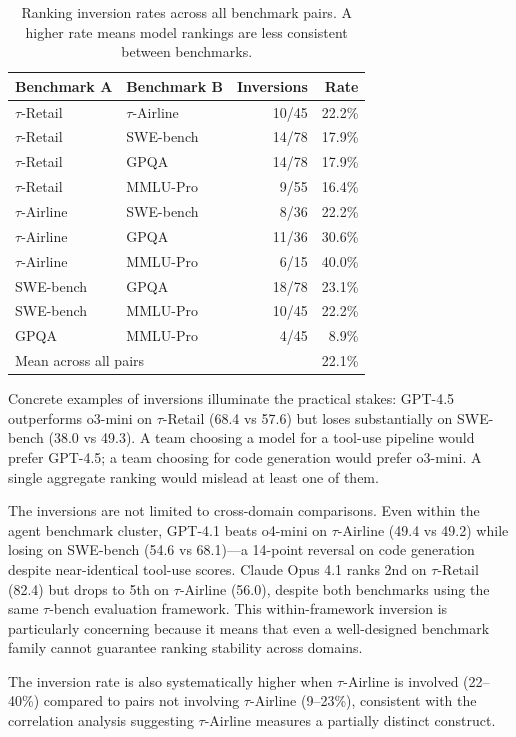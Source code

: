 \documentclass[sigconf]{acmart}
\begin{document}
\begin{table}[t]
\caption{Ranking inversion rates across all benchmark pairs. A higher rate means model rankings are less consistent between benchmarks.}
\label{tab:inversions}
\begin{tabular}{llrr}
\toprule
Benchmark A & Benchmark B & Inversions & Rate \\
\midrule
$\tau$-Retail & $\tau$-Airline & 10/45 & 22.2\% \\
$\tau$-Retail & SWE-bench & 14/78 & 17.9\% \\
$\tau$-Retail & GPQA & 14/78 & 17.9\% \\
$\tau$-Retail & MMLU-Pro & 9/55 & 16.4\% \\
$\tau$-Airline & SWE-bench & 8/36 & 22.2\% \\
$\tau$-Airline & GPQA & 11/36 & 30.6\% \\
$\tau$-Airline & MMLU-Pro & 6/15 & 40.0\% \\
SWE-bench & GPQA & 18/78 & 23.1\% \\
SWE-bench & MMLU-Pro & 10/45 & 22.2\% \\
GPQA & MMLU-Pro & 4/45 & 8.9\% \\
\midrule
\multicolumn{2}{l}{Mean across all pairs} & & 22.1\% \\
\bottomrule
\end{tabular}
\end{table}

Concrete examples of inversions illuminate the practical stakes: GPT-4.5 outperforms o3-mini on $\tau$-Retail (68.4 vs 57.6) but loses substantially on SWE-bench (38.0 vs 49.3). A team choosing a model for a tool-use pipeline would prefer GPT-4.5; a team choosing for code generation would prefer o3-mini. A single aggregate ranking would mislead at least one of them.

The inversions are not limited to cross-domain comparisons. Even within the agent benchmark cluster, GPT-4.1 beats o4-mini on $\tau$-Airline (49.4 vs 49.2) while losing on SWE-bench (54.6 vs 68.1)---a 14-point reversal on code generation despite near-identical tool-use scores. Claude Opus 4.1 ranks 2nd on $\tau$-Retail (82.4) but drops to 5th on $\tau$-Airline (56.0), despite both benchmarks using the same $\tau$-bench evaluation framework. This within-framework inversion is particularly concerning because it means that even a well-designed benchmark family cannot guarantee ranking stability across domains.

The inversion rate is also systematically higher when $\tau$-Airline is involved (22--40\%) compared to pairs not involving $\tau$-Airline (9--23\%), consistent with the correlation analysis suggesting $\tau$-Airline measures a partially distinct construct.
\end{document}
